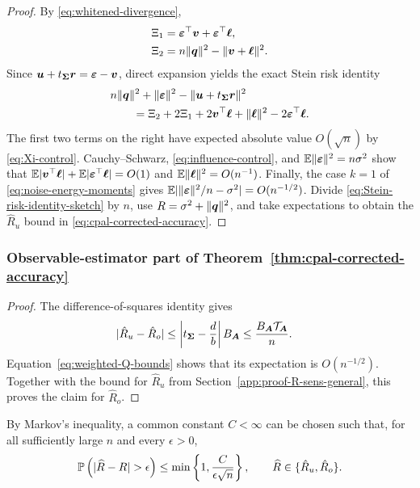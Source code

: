 \documentclass{article}
\theoremstyle{plain} %
\theoremstyle{definition} %
\theoremstyle{definition} %
\newcommand{\hR}{\hat{R}}
\begin{document}
\begin{proof}
By \eqref{eq:whitened-divergence},
\begin{align*}
    \Xi_1&={\boldsymbol{\varepsilon} }^\top\boldsymbol{v}+{\boldsymbol{\varepsilon} }^\top\boldsymbol{\ell},\\
    \Xi_2&=n\lVert\boldsymbol{q}\rVert^2-\lVert\boldsymbol{v}+\boldsymbol{\ell}\rVert^2.
\end{align*}
Since $\boldsymbol{u}+t_{\boldsymbol{\Sigma}}\boldsymbol{r}={\boldsymbol{\varepsilon} }-\boldsymbol{v}$, direct expansion yields the exact Stein
risk identity
\begin{align}
    &n\lVert\boldsymbol{q}\rVert^2+\lVert{\boldsymbol{\varepsilon} }\rVert^2-\lVert\boldsymbol{u}+t_{\boldsymbol{\Sigma}}\boldsymbol{r}\rVert^2\notag\\
    &\qquad=
    \Xi_2+2\Xi_1+2\boldsymbol{v}^\top\boldsymbol{\ell}+\lVert\boldsymbol{\ell}\rVert^2
    -2{\boldsymbol{\varepsilon} }^\top\boldsymbol{\ell}.
    \label{eq:Stein-risk-identity-sketch}
\end{align}
The first two terms on the right have expected absolute value $O(\sqrt n)$ by
\eqref{eq:Xi-control}.  Cauchy--Schwarz,
\eqref{eq:influence-control}, and
${\mathbb{E}}\lVert{\boldsymbol{\varepsilon} }\rVert^2=n\sigma^2$ show that
${\mathbb{E}}|\boldsymbol{v}^\top\boldsymbol{\ell}|+{\mathbb{E}}|{\boldsymbol{\varepsilon} }^\top\boldsymbol{\ell}|=O(1)$ and
${\mathbb{E}}\lVert\boldsymbol{\ell}\rVert^2=O(n^{-1})$.  Finally, the case $k=1$ of
\eqref{eq:noise-energy-moments} gives
${\mathbb{E}}|\lVert{\boldsymbol{\varepsilon} }\rVert^2/n-\sigma^2|=O(n^{-1/2})$.
Divide \eqref{eq:Stein-risk-identity-sketch} by $n$, use
$R=\sigma^2+\lVert\boldsymbol{q}\rVert^2$, and take expectations to obtain
the $\hR_u$ bound in \eqref{eq:cpal-corrected-accuracy}.
\end{proof}

\subsubsection{Observable-estimator part of Theorem~\ref{thm:cpal-corrected-accuracy}}
\label{app:proof-R-obs-general}

\begin{proof}
The difference-of-squares identity gives
\begin{align*}
    |\hR_u-\hR_o|
    &\leq
    \left|t_{\bSigma}-\frac{d}{b}\right|B_{\bA}
    \leq \frac{B_{\bA}\mathcal T_{\bA}}{n}.
\end{align*}
Equation~\eqref{eq:weighted-Q-bounds} shows that its expectation is
$O(n^{-1/2})$. Together with the bound for $\hR_u$ from
Section~\ref{app:proof-R-sens-general}, this proves the claim for $\hR_o$.
\end{proof}

By Markov's inequality, a common constant $C<\infty$ can be chosen
such that, for all sufficiently large $n$ and every $\epsilon>0$,
\begin{align*}
    \P\left(|\widehat R-R|>\epsilon\right)
    \leq\min\left\{1,\frac{C}{\epsilon\sqrt n}\right\},
    \qquad
    \widehat R\in\{\hR_u,\hR_o\}.
\end{align*}
\end{document}

